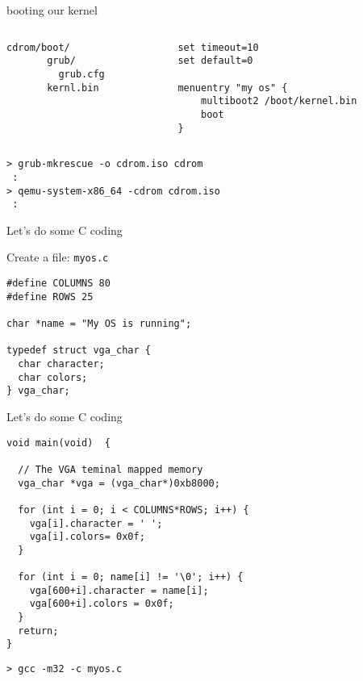 \documentclass[aspectratio=169,12pt,handout]{beamer}
\begin{document}
\begin{frame}[fragile]{booting our kernel}

\begin{columns}
 \begin{column}{0.5\textwidth}
\begin{lstlisting}
cdrom/boot/
       grub/
         grub.cfg
       kernl.bin
\end{lstlisting}
 \end{column}
 \begin{column}{0.5\textwidth}
\begin{lstlisting}
set timeout=10
set default=0

menuentry "my os" {
    multiboot2 /boot/kernel.bin
    boot
}
\end{lstlisting}
 \end{column}
\end{columns}

\begin{verbatim}
> grub-mkrescue -o cdrom.iso cdrom
 :
> qemu-system-x86_64 -cdrom cdrom.iso
 :
\end{verbatim}
\end{frame}

\begin{frame}[fragile]{Let's do some C coding}

  Create a file: {\tt myos.c}
  
\begin{lstlisting}
#define COLUMNS 80
#define ROWS 25

char *name = "My OS is running";
  
typedef struct vga_char {
  char character;
  char colors;
} vga_char;
\end{lstlisting}
\end{frame}

\begin{frame}[fragile]{Let's do some C coding}

  \begin{lstlisting}
void main(void)  {

  // The VGA teminal mapped memory 
  vga_char *vga = (vga_char*)0xb8000; 	

  for (int i = 0; i < COLUMNS*ROWS; i++) {
    vga[i].character = ' ';
    vga[i].colors= 0x0f;
  }
  
  for (int i = 0; name[i] != '\0'; i++) {
    vga[600+i].character = name[i];
    vga[600+i].colors = 0x0f;
  }
  return;
}
  \end{lstlisting}

\begin{verbatim}
> gcc -m32 -c myos.c
\end{verbatim}
  
\end{frame}
\end{document}
